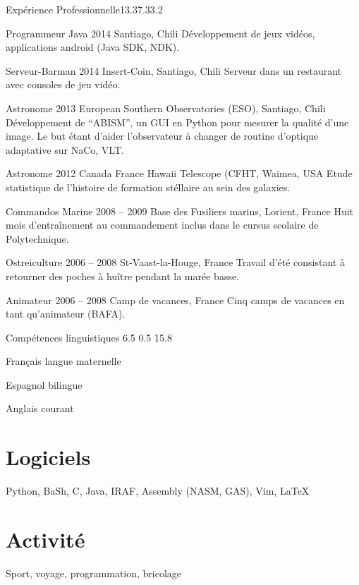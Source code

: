 \documentclass[30pt, french]{tccv}
\begin{document}
\begin{upshape}
\begin{flat_frame}{Expérience Professionnelle}{13.3}{7.3}{3.2}{}
\begin{joblist}
\item[Programmeur Java]{2014}
	{Santiago, Chili}
	{Développement de jeux vidéos, applications android (Java SDK, NDK).}


\item[Serveur-Barman]{2014}
	{Insert-Coin, Santiago, Chili}
	{Serveur dans un restaurant avec consoles de jeu vidéo.}


\item[Astronome]{2013}
	{European Southern Observatories (ESO), Santiago, Chili}
	{Développement de ``ABISM'', un GUI en Python pour mesurer la qualité d'une image.
 	Le but étant d'aider l'observateur à changer de routine d'optique adaptative sur NaCo, VLT.}


\item[Astronome]{2012}
	{Canada France Hawaii Telescope (CFHT, Waimea, USA}
	{Etude statistique de l'histoire de formation stéllaire au sein des galaxies.}


\item[Commandos Marine]{2008 -- 2009}
	{Base des Fusiliers marins, Lorient, France}
	{Huit mois d'entraînement au commandement inclus dans le cursus scolaire de Polytechnique.}


\item[Ostreiculture]{2006 -- 2008}
	{St-Vaast-la-Houge, France}
	{Travail d'été consistant à retourner des poches à huître pendant la marée basse.}


\item[Animateur]{2006 -- 2008}
	{Camp de vacances, France}
	{Cinq camps de vacances en tant qu'animateur (BAFA).}

\end{joblist}
\end{flat_frame}



\begin{rounded_frame}{Compétences linguistiques}{ 6.5 } { 0.5 }{ 15.8 }{}


\begin{factlist}
\item{Français}	{langue maternelle}
\item{Espagnol}	{bilingue}
\item{Anglais}	{courant} 
\end{factlist}

\section{Logiciels}
		Python, 
		BaSh, 
		C, 
		Java,
		IRAF, 
		Assembly (NASM, GAS), 
		Vim, 
		\LaTeX


\section{Activité}
	Sport, voyage, programmation, bricolage



\end{rounded_frame}



\end{upshape}
\end{document}
